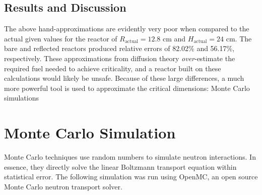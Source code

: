 \documentclass{anstrans}
\begin{document}
    \subsection{Results and Discussion}
    The above hand-approximations are evidently very poor when compared to the actual given values for the reactor of $R_{\text{actual}}=12.8$ cm and $H_{\text{actual}}=24$ cm.
    The bare and reflected reactors produced relative errors of 82.02\% and 56.17\%, respectively.
    These approximations from diffusion theory \textit{over}-estimate the required fuel needed to achieve criticality, and a reactor built on these calculations would likely be unsafe.
    Because of these large differences, a much more powerful tool is used to approximate the critical dimensions: Monte Carlo simulations


    \section{Monte Carlo Simulation}
    Monte Carlo techniques use random numbers to simulate neutron interactions.
    In essence, they directly solve the linear Boltzmann transport equation within statistical error.
    The following simulation was run using OpenMC, an open source Monte Carlo neutron transport solver.
\end{document}
